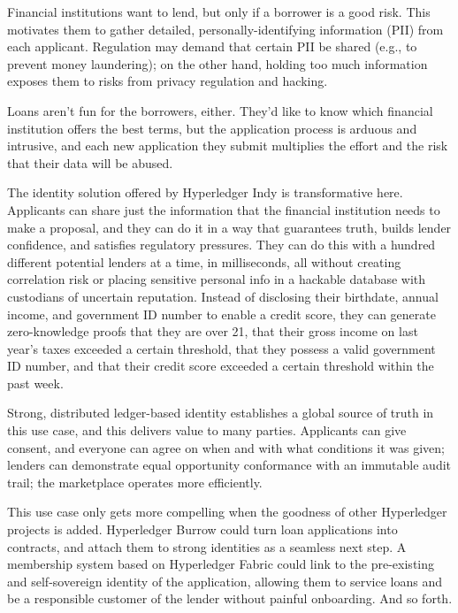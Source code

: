 Financial institutions want to lend, but only if a borrower is a good risk. This motivates them to gather detailed, personally-identifying information (PII) from each applicant. Regulation may demand that certain PII be shared (e.g., to prevent money laundering); on the other hand, holding too much information exposes them to risks from privacy regulation and hacking.

Loans aren't fun for the borrowers, either. They'd like to know which financial institution offers the best terms, but the application process is arduous and intrusive, and each new application they submit multiplies the effort and the risk that their data will be abused.

The identity solution offered by Hyperledger Indy is transformative here. Applicants can share just the information that the financial institution needs to make a proposal, and they can do it in a way that guarantees truth, builds lender confidence, and satisfies regulatory pressures. They can do this with a hundred different potential lenders at a time, in milliseconds, all without creating correlation risk or placing sensitive personal info in a hackable database with custodians of uncertain reputation. Instead of disclosing their birthdate, annual income, and government ID number to enable a credit score, they can generate zero-knowledge proofs that they are over 21, that their gross income on last year’s taxes exceeded a certain threshold, that they possess a valid government ID number, and that their credit score exceeded a certain threshold within the past week.

Strong, distributed ledger-based identity establishes a global source of truth in this use case, and this delivers value to many parties. Applicants can give consent, and everyone can agree on when and with what conditions it was given; lenders can demonstrate equal opportunity conformance with an immutable audit trail; the marketplace operates more efficiently.

This use case only gets more compelling when the goodness of other Hyperledger projects is added. Hyperledger Burrow could turn loan applications into contracts, and attach them to strong identities as a seamless next step. A membership system based on Hyperledger Fabric could link to the pre-existing and self-sovereign identity of the application, allowing them to service loans and be a responsible customer of the lender without painful onboarding. And so forth.
